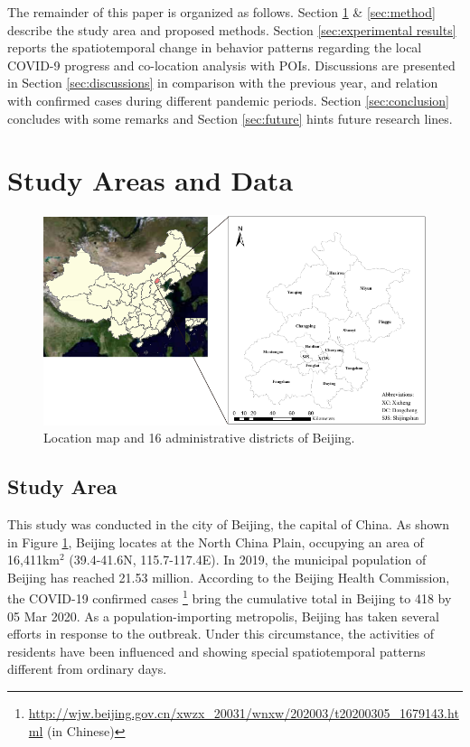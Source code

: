\documentclass[ijgi,submit,moreauthors,pdftex]{Definitions/mdpi}
\begin{document}
The remainder of this paper is organized as follows. 
Section \ref{sec:data} \& \ref{sec:method} describe the study area and proposed methods.
Section \ref{sec:experimental results} reports the spatiotemporal change in behavior patterns regarding the local COVID-9 progress and co-location analysis with POIs.
Discussions are presented in Section \ref{sec:discussions} in comparison with the previous year, and relation with confirmed cases during different pandemic periods.
Section \ref{sec:conclusion} concludes with some remarks and Section \ref{sec:future} hints future research lines.


\section{Study Areas and Data}\label{sec:data}

\begin{figure}[ht]
    \centering
    \includegraphics[width=\textwidth]{Figures/StudyArea.pdf}
    \caption{Location map and 16 administrative districts of Beijing.}
    \label{fig:study_area}
\end{figure}

\subsection{Study Area}
This study was conducted in the city of Beijing, the capital of China.
As shown in Figure \ref{fig:study_area}, Beijing locates at the North China Plain, occupying an area of 16,411km$^2$ (39.4{\degree}-41.6{\degree}N, 115.7{\degree}-117.4{\degree}E).
In 2019, the municipal population of Beijing has reached 21.53 million. According to the Beijing Health Commission, the COVID-19 confirmed cases \footnote{\url{http://wjw.beijing.gov.cn/xwzx_20031/wnxw/202003/t20200305_1679143.html} (in Chinese)} bring the cumulative total in Beijing to 418 by 05 Mar 2020.
As a population-importing metropolis, Beijing has taken several efforts in response to the outbreak. 
Under this circumstance, the activities of residents have been influenced and showing special spatiotemporal patterns different from ordinary days.
\end{document}
